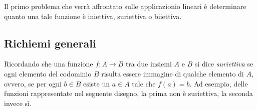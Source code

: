 \documentclass{book}
\theoremstyle{definition}
\theoremstyle{plain}
\begin{document}
Il primo problema che verrà affrontato sulle applicazionio lineari è determinare quanto
una tale funzione è iniettiva, suriettiva o biiettiva.

\subsection{Richiemi generali}
\label{sec:richgen}

Ricordando che una funzione $f:A\to B$ tra due insiemi $A$ e $B$ si dice \emph{suriettiva}
se ogni elemento del codominio $B$ risulta essere immagine di qualche elemento di $A$,
ovvero, se per ogni $b\in B$ esiste un $a\in A$ tale che $f(a)=b$. Ad esempio, delle
funzioni rappresentate nel seguente disegno, la prima non è suriettiva, la seconda invece sì.
\end{document}
